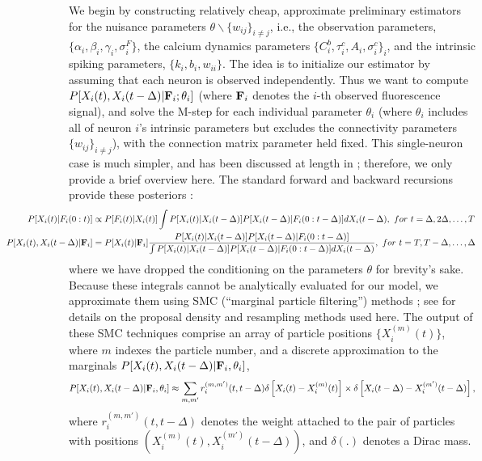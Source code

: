 We begin by constructing relatively cheap, approximate preliminary
estimators for the nuisance parameters $\theta \backslash
\{w_{ij}\}_{i \neq j}$, i.e., the observation parameters,
$\{\alpha_i,\beta_i,\gamma_i,\sigma^F_i\}$, the calcium dynamics
parameters $\{C^b_i,\tau^c_i, A_i, \sigma^c_i\}_i$, and the intrinsic
spiking parameters, $\{k_i,b_i,w_{ii}\}$.  The idea is to initialize
our estimator by assuming that each neuron is observed independently.
Thus we want to compute $P[X_i(t), X_i(t-\Delta) | {\bf F}_i; \mathbf{\theta}_i]$
(where ${\bf F}_i$ denotes the $i$-th observed fluorescence signal), and
solve the M-step for each individual parameter $\theta_i$ (where
$\theta_i$ includes all of neuron $i$'s intrinsic parameters but
excludes the connectivity parameters $\{w_{ij}\}_{i \neq j}$), with
the connection matrix parameter held fixed.  This single-neuron case
is much simpler, and has been discussed at length in
\cite{Vogelstein2009}; therefore, we only provide a brief overview
here. The standard forward and backward recursions provide these
posteriors \cite{ShumwayStoffer06}:
\begin{align} 
\hspace{-25mm}  P[X_i(t) | F_i(0:t)] &\propto P[F_i(t)| X_i(t)] \int P[X_i(t) |
    X_i(t-\Delta)] P[X_i(t-\Delta) | F_i(0:t-\Delta)] dX_i(t-\Delta),
    ~ for ~ t=\Delta, 2 \Delta, \ldots, T
\label{eqn:forward} \\ 
\hspace{-25mm} P[X_i(t), X_i(t-\Delta) | \bF_i] &= P[X_i(t) | \bF_i]
\frac{P[X_i(t) | X_i(t-\Delta)] P[X_i(t-\Delta) |
F_i(0:t-\Delta)]}{\int P[X_i(t) | X_i(t-\Delta)] P[X_i(t-\Delta) |
F_i(0:t-\Delta)] dX_i(t-\Delta)}, ~ for ~ t=T, T- \Delta, \ldots,
\Delta
\label{eqn:backward}
\end{align}
where we have dropped the conditioning on the parameters $\theta$ for
brevity's sake. Because these integrals cannot be analytically
evaluated for our model, we approximate them using SMC (``marginal
particle filtering'') methods \cite{DGA00,DFG01,GDW04}; see
\cite{Vogelstein2009} for details on the proposal density and
resampling methods used here. The output of these SMC techniques
comprise an array of particle positions $\{X_i^{(m)}(t)\}$, where $m$
indexes the particle number, and a discrete approximation to the
marginals $P[X_i(t), X_i(t-\Delta) | {\bf F}_i, \theta_i]$,
\begin{equation}
  P[X_i(t), X_i(t-\Delta) | \bF_i, \theta_i] \approx \sum_{m,m'}
  r_i^{(m,m')}(t,t-\Delta) \delta \left[ X_i(t) - X_i^{(m)}(t) \right]
  \times \delta \left[ X_i(t-\Delta) - X_i^{(m')}(t-\Delta) \right],
  \label{eq:particle-fb}
\end{equation}
where $r_i^{(m,m')}(t,t-\Delta)$ denotes the weight attached to the
pair of particles with positions $\left( X_i^{(m)}(t),
X_i^{(m')}(t-\Delta) \right)$, and $\delta(.)$ denotes a Dirac mass.

